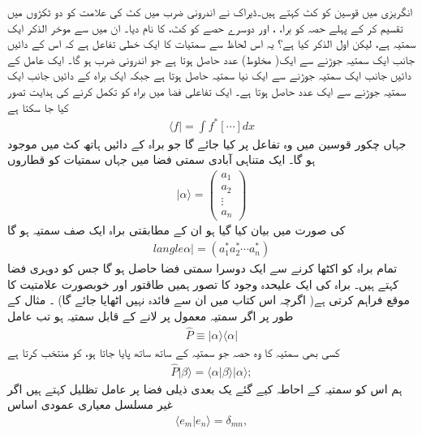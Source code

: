 

انگریزی میں قوسین کو  کٹ  کہتے ہیں۔ڈیراک نے اندرونی ضرب  میں   کٹ  کی علامت کو دو ٹکڑوں میں تقسیم کر کے پہلے حصہ کو برا،    ،  اور دوسرے حصے کو کٹ،    کا نام دیا۔ ان میں سے موخر الذکر ایک سمتیہ ہے، لیکن  اول الذکر کیا ہے؟ یہ اس لحاظ سے سمتیات کا ایک خطی تفاعل ہے کہ اس کے دائیں جانب ایک سمتیہ جوڑنے سے ایک( مخلوط)  عدد حاصل ہوتا ہے جو اندرونی ضرب ہو گا۔ ایک  عامل کے دائیں جانب ایک سمتیہ جوڑنے سے ایک نیا سمتیہ حاصل ہوتا ہے جبکہ ایک براہ کے دائیں جانب ایک سمتیہ جوڑنے سے ایک عدد حاصل ہوتا ہے۔ ایک تفاعلی فضا میں براہ کو تکمل کرنے کی ہدایت تصور کیا جا سکتا ہے 
\begin{align*}
\langle f | = \int f^{*} [ \cdots ] dx
\end{align*}
جہاں چکور قوسین میں وہ تفاعل پر کیا جائے گا جو براہ کے دائیں ہاتھ کٹ میں موجود ہو گا۔ ایک متناہی آبادی سمتی فضا میں جہاں سمتیات کو قطاروں 
\begin{align}
| \alpha \rangle = \begin{pmatrix}
a_{1} \\ a_{2} \\ \vdots \\ a_{n} 
\end{pmatrix}
\end{align}
کی صورت میں بیان کیا گیا ہو ان کے مطابقتی براہ ایک صف سمتیہ ہو گا
\begin{align}
langle \alpha | = ( a_{1}^{*}a_{2}^{*} \cdots a_{n}^{*})
\end{align}
تمام براہ کو اکٹھا کرنے سے ایک دوسرا سمتی فضا حاصل ہو گا جس کو دوہری فضا کہتے ہیں۔
براہ کی ایک علیحدہ وجود کا تصور ہمیں طاقتور اور خوبصورت علامتیت کا موقع فراہم کرتی ہے( اگرچہ اس کتاب میں ان سے فائدہ نہیں اٹھایا جائے گا) ۔ مثال کے طور پر اگر سمتیہ  معمول پر لانے کے قابل سمتیہ ہو تب عامل 
\begin{align}
\hat{P} \equiv | \alpha \rangle \langle \alpha | 
\end{align}
کسی بھی سمتیہ کا وہ حصہ جو سمتیہ  کے ساتھ ساتھ پایا جاتا ہو، کو منتخب کرتا ہے 
\begin{align*}
\hat{P} | \beta \rangle = \langle \alpha | \beta \rangle | \alpha \rangle ;
\end{align*}
ہم اس کو سمتیہ  کے احاطہ کیے گئے یک بعدی ذیلی فضا پر عامل تظلیل کہتے ہیں اگر  غیر مسلسل معیاری عمودی اساس
\begin{align}
\langle e_{m} | e_{n} \rangle = \delta_{mn},
\end{align}
